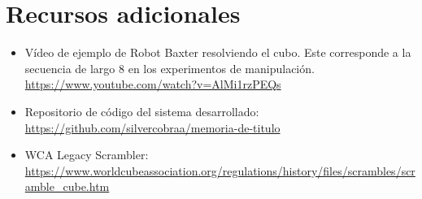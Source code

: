 \newpage
\newpage
\section*{Recursos adicionales}

\begin{itemize}
	\item Vídeo de ejemplo de Robot Baxter resolviendo el cubo. Este corresponde a la secuencia de largo 8 en los experimentos de manipulación.
	\url{https://www.youtube.com/watch?v=AlMi1rzPEQs}
	\item Repositorio de código del sistema desarrollado: \url{https://github.com/silvercobraa/memoria-de-titulo}
	\item WCA Legacy Scrambler: \url{https://www.worldcubeassociation.org/regulations/history/files/scrambles/scramble_cube.htm}
\end{itemize}
